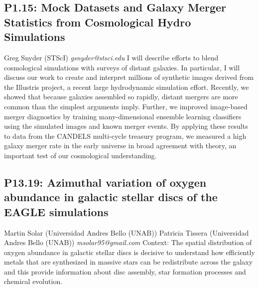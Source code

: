 \documentclass{report}
\begin{document}
\subsection*{P1.15: Mock Datasets and Galaxy Merger Statistics from Cosmological Hydro Simulations}
\bigskip
Greg Snyder (STScI) \newline   \newline   \newline   \newline  \newline  \newline\newline
{\it gsnyder@stsci.edu}\newline
\newline\newline
I will describe efforts to blend cosmological simulations with surveys of distant galaxies. In particular, I will discuss our work to create and interpret millions of synthetic images derived from the Illustris project, a recent large hydrodynamic simulation effort. Recently, we showed that because galaxies assembled so rapidly, distant mergers are more common than the simplest arguments imply. Further, we improved image-based merger diagnostics by training many-dimensional ensemble learning classifiers using the simulated images and known merger events. By applying these results to data from the CANDELS multi-cycle treasury program, we measured a high galaxy merger rate in the early universe in broad agreement with theory, an important test of our cosmological understanding.\newline
\newpage
\subsection*{P13.19: Azimuthal variation of oxygen abundance in galactic stellar discs of the EAGLE simulations}
\bigskip
Martin Solar (Universidad Andres Bello (UNAB)) \newline Patricia Tissera (Universidad Andres Bello (UNAB)) \newline   \newline   \newline  \newline  \newline\newline
{\it msolar95@gmail.com}\newline
\newline\newline
Context: The spatial distribution of oxygen abundance in galactic stellar discs is decisive to understand how efficiently metals that are synthesized in massive stars can be redistribute across the galaxy and this provide information about disc assembly, star formation processes and chemical evolution.
\end{document}
